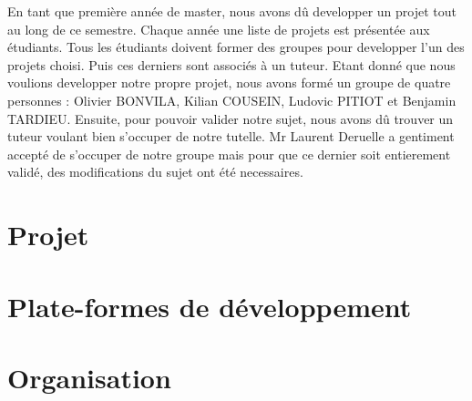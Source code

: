 En tant que première année de master, nous avons dû developper un projet tout au long de ce semestre. Chaque année une liste de projets est présentée aux étudiants. Tous les étudiants doivent former des groupes pour developper l'un des projets choisi. Puis ces derniers sont associés à un tuteur. Etant donné que nous voulions developper notre propre projet, nous avons formé un groupe de quatre personnes : Olivier BONVILA, Kilian COUSEIN, Ludovic PITIOT et Benjamin TARDIEU. Ensuite, pour pouvoir valider notre sujet, nous avons dû trouver un tuteur voulant bien s'occuper de notre tutelle. Mr Laurent Deruelle a gentiment accepté de s'occuper de notre groupe mais pour que ce dernier soit entierement validé, des modifications du sujet ont été necessaires.

\section{Projet}	
	

\section{Plate-formes de développement}
	
	
\section{Organisation}
	
